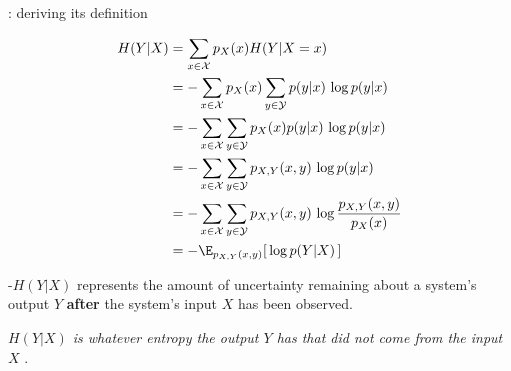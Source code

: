 \begin{frame}{\subsecname: deriving its definition}

\begin{align}
H(Y|X) 
&= \sum_{x \in \mathcal{X}} p_X(x) H(Y|X=x) \\
&= -\sum_{x \in \mathcal{X}} p_X(x) \sum_{y \in \mathcal{Y}} p(y|x)\,\log p(y|x) \\
&= -\sum_{x \in \mathcal{X}} \sum_{y \in \mathcal{Y}} p_X(x) p(y|x)\,\log p(y|x) \\
&= -\sum_{x \in \mathcal{X}} \sum_{y \in \mathcal{Y}} p_{X,Y}(x,y)\,\log p(y|x) \\
&= -\sum_{x \in \mathcal{X}} \sum_{y \in \mathcal{Y}} p_{X,Y}(x,y)\,\log \frac{p_{X,Y}(x,y)}{p_X(x)} \\
&= -\E_{p_{X,Y}(x,y)} \lbrack \, \log p(Y|X) \, \rbrack
\end{align}

\end{frame}

\begin{frame}{\subsecname}


-$H(Y|X)$ represents the amount of uncertainty remaining about a system's output $Y$ \textbf{after} the 
system's input $X$ has been observed.

\pause


\pause

\emph{
$H(Y|X)$ is whatever entropy the output $Y$ has that did not come from the input $X$
}
.



\end{frame}

